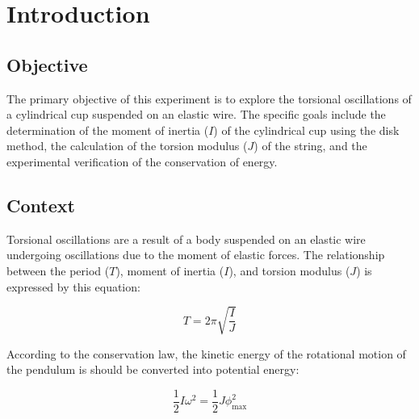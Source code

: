 \chapter{Introduction}

\section{Objective}

The primary objective of this experiment is to explore the torsional oscillations of a cylindrical cup suspended on an elastic wire. The specific goals include the determination of the moment of inertia ($I$) of the cylindrical cup using the disk method, the calculation of the torsion modulus ($J$) of the string, and the experimental verification of the conservation of energy.

\section{Context}

Torsional oscillations are a result of a body suspended on an elastic wire undergoing oscillations due to the moment of elastic forces. The relationship between the period ($T$), moment of inertia ($I$), and torsion modulus ($J$) is expressed by this equation: 

\[ T = 2\pi \sqrt{\frac{I}{J}}\]

\noindent According to the conservation law, the kinetic energy of the rotational motion of the pendulum is should be converted into potential energy:

\[ \frac{1}{2}I\omega^2 = \frac{1}{2}J\phi_{\max}^2\]

